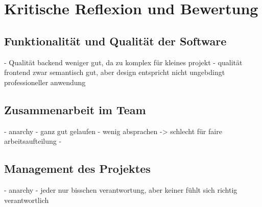 \section{Kritische Reflexion und Bewertung}

\subsection{Funktionalität und Qualität der Software}
- Qualität backend weniger gut, da zu komplex für kleines projekt
- qualität frontend zwar semantisch gut, aber design entspricht nicht ungebdingt professioneller anwendung

\subsection{Zusammenarbeit im Team}

- anarchy
- ganz gut gelaufen
- wenig absprachen -> schlecht für faire arbeitsaufteilung
- 

\subsection{Management des Projektes}
- anarchy
- jeder nur bisschen verantwortung, aber keiner fühlt sich richtig verantwortlich
